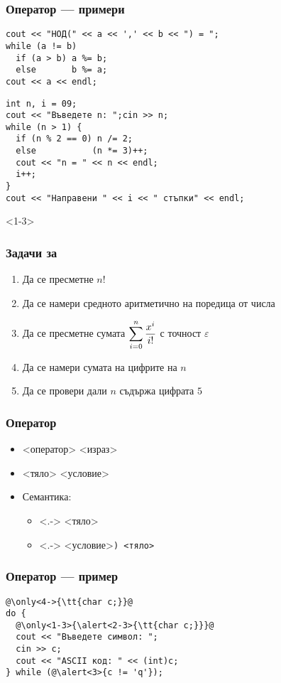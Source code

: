 \documentclass{beamer}
\newcommand{\expsum}{\displaystyle \sum_{i=0}^n \limits \frac{x^i}{i!}}
\begin{document}
\begin{frame}[fragile]
  \frametitle{Оператор  --- примери}

\begin{lstlisting}
cout << "НОД(" << a << ',' << b << ") = ";
while (a != b)
  if (a > b) a %= b;
  else       b %= a;
cout << a << endl;
\end{lstlisting}
\pause
\begin{lstlisting}
int n, i = 09;
cout << "Въведете n: ";cin >> n;
while (n > 1) {
  if (n % 2 == 0) n /= 2;
  else           (n *= 3)++;
  cout << "n = " << n << endl;
  i++;
}
cout << "Направени " << i << " стъпки" << endl;
\end{lstlisting}
\end{frame}

\begin{frame}<1-3>
  \frametitle{Задачи за }

  \begin{enumerate}[<+->]
  \item Да се пресметне $n!$
  \item Да се намери средното аритметично на поредица от числа
  \item Да се пресметне сумата $\expsum$ с точност $\varepsilon$
  \item Да се намери сумата на цифрите на $n$
  \item Да се провери дали $n$ съдържа цифрата $5$
  \end{enumerate}
\end{frame}

\begin{frame}
  \frametitle{Оператор }

  \begin{itemize}[<+->]
  \item {} <оператор> <израз>\tta{);}
  \item {} <тяло> <условие>\tta{);}
  \item Семантика:
    \begin{itemize}
    \item<.-> <тяло>
    \item<.-> <условие>\tt) <тяло>
    \end{itemize}
  \end{itemize}
\end{frame}

\begin{frame}
  \frametitle{Оператор  --- пример}

\begin{lstlisting}
@\only<4->{\tt{char c;}}@
do {
  @\only<1-3>{\alert<2-3>{\tt{char c;}}}@
  cout << "Въведете символ: ";
  cin >> c;
  cout << "ASCII код: " << (int)c;
} while (@\alert<3>{c != 'q'});
\end{lstlisting}
\end{frame}
\end{document}
